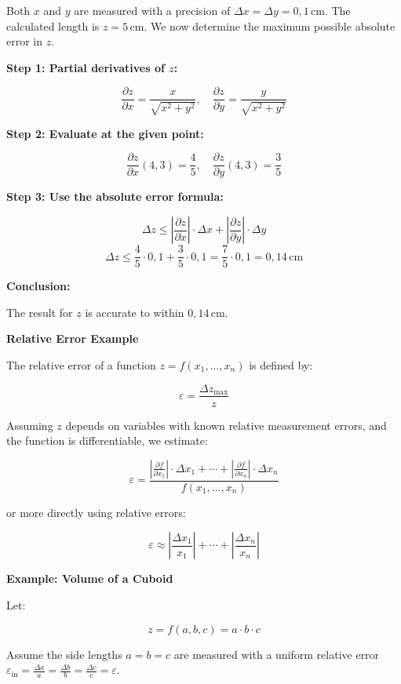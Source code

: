 Both \(x\) and \(y\) are measured with a precision of \( \Delta x = \Delta y = 0{,}1 \, \text{cm} \). 
The calculated length is \( z = 5 \, \text{cm} \). We now determine the maximum possible absolute 
error in \(z\).

\textbf{Step 1: Partial derivatives of \(z\):}

\[
    \frac{\partial z}{\partial x} = \frac{x}{\sqrt{x^2 + y^2}}, \quad
    \frac{\partial z}{\partial y} = \frac{y}{\sqrt{x^2 + y^2}}
\]

\textbf{Step 2: Evaluate at the given point:}

\[
    \frac{\partial z}{\partial x}(4, 3) = \frac{4}{5}, \quad
    \frac{\partial z}{\partial y}(4, 3) = \frac{3}{5}
\]

\textbf{Step 3: Use the absolute error formula:}

\[
    \Delta z \leq \left| \frac{\partial z}{\partial x} \right| \cdot \Delta x + \left| \frac{\partial z}
    {\partial y} \right| \cdot \Delta y
\]
\[
    \Delta z \leq \frac{4}{5} \cdot 0{,}1 + \frac{3}{5} \cdot 0{,}1 = \frac{7}{5} \cdot 0{,}1 = 0{,}14 \, 
    \text{cm}
\]

\textbf{Conclusion:}  

The result for \(z\) is accurate to within \( 0{,}14 \, \text{cm} \).

\textbf{Relative Error Example}

The relative error of a function \( z = f(x_1, \dots, x_n) \) is defined by:

\[
    \varepsilon = \frac{\Delta z_{\max}}{z}
\]

Assuming \(z\) depends on variables with known relative measurement errors, and the function is 
differentiable, we estimate:

\[
    \varepsilon = \frac{\left| \frac{\partial f}{\partial x_1} \right| \cdot 
    \Delta x_1 + \cdots + \left| \frac{\partial f}{ 
    \partial x_n}\right| \cdot \Delta x_n}{f(x_1, \dots, x_n)}
\]

or more directly using relative errors:

\[
    \varepsilon \approx \left| \frac{\Delta x_1}{x_1} \right| + \cdots + \left| \frac{\Delta x_n}{x_n} 
    \right|
\]

\textbf{Example: Volume of a Cuboid}

Let:

\[
    z = f(a, b, c) = a \cdot b \cdot c
\]

Assume the side lengths \( a = b = c \) are measured with a uniform relative error 
\( \varepsilon_{\text{in}} = \frac{\Delta a}{a} = \frac{\Delta b}{b} = \frac{\Delta c}{c} = \varepsilon \).

